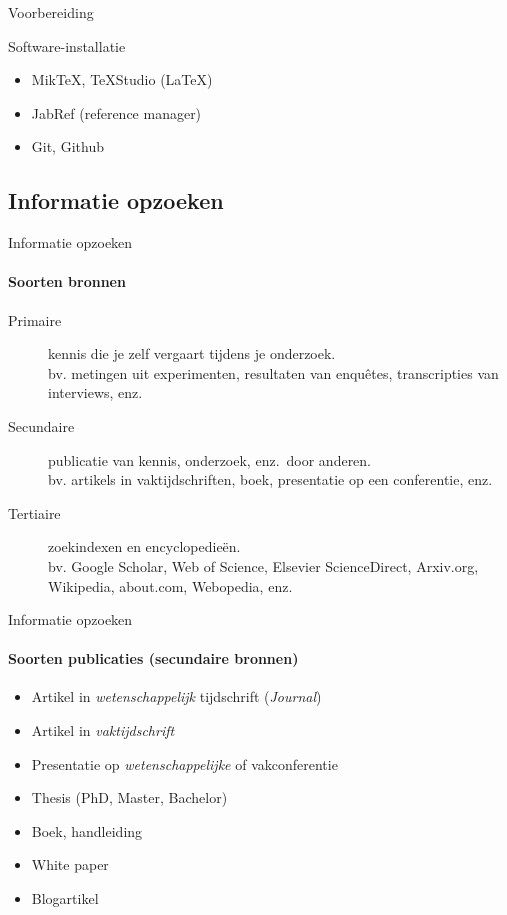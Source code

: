 \begin{frame}{Voorbereiding}

  Software-installatie
  
  \begin{itemize}
    \item Mik\TeX{}, \TeX{}Studio (\LaTeX{})
    \item JabRef (reference manager)
    \item Git, Github
  \end{itemize}
\end{frame}

\subsection{Informatie opzoeken}
\begin{frame}{Informatie opzoeken}
  \framesubtitle{Soorten bronnen}
  
  \begin{description}
    \item[Primaire] kennis die je zelf vergaart tijdens je onderzoek.\\bv. metingen uit experimenten, resultaten van enquêtes, transcripties van interviews, enz.
    \item[Secundaire] publicatie van kennis, onderzoek, enz.~door anderen.\\bv. artikels in vaktijdschriften, boek, presentatie op een conferentie, enz.
    \item[Tertiaire] zoekindexen en encyclopedieën.\\bv. Google Scholar, Web of Science, Elsevier ScienceDirect, Arxiv.org, Wikipedia, about.com, Webopedia, enz.
  \end{description}
  
\end{frame}

\begin{frame}{Informatie opzoeken}
  \framesubtitle{Soorten publicaties (secundaire bronnen)}
  
  \begin{itemize}
    \item Artikel in \emph{wetenschappelijk} tijdschrift (\emph{Journal})
    \item Artikel in \emph{vaktijdschrift}
    \item Presentatie op \emph{wetenschappelijke} of vakconferentie
    \item Thesis (PhD, Master, Bachelor)
    \item Boek, handleiding
    \item White paper
    \item Blogartikel
  \end{itemize}
\end{frame}

